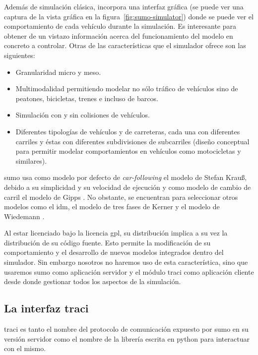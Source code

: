 Además de simulación clásica, incorpora una interfaz gráfica (se puede ver una captura de la vista gráfica en la figura~\ref{fig:sumo-simulator}) donde se puede ver el comportamiento de cada vehículo durante la simulación. Es interesante para obtener de un vistazo información acerca del funcionamiento del modelo en concreto a controlar. Otras de las características que el simulador ofrece son las siguientes:

\begin{itemize}
	\item Granularidad micro y meso.
	\item Multimodalidad permitiendo modelar no sólo tráfico de vehículos sino de peatones, bicicletas, trenes e incluso de barcos.
	\item Simulación con y sin colisiones de vehículos.
	\item Diferentes tipologías de vehículos y de carreteras, cada una con diferentes carriles y éstas con diferentes subdivisiones de subcarriles (diseño conceptual para permitir modelar comportamientos en vehículos como motocicletas y similares).
\end{itemize}

\gls{sumo} usa como modelo por defecto de \textit{\gls{car-following}} el modelo de Stefan Krauß\cite{jin2016evaluation}, debido a su simplicidad y su velocidad de ejecución y como modelo de cambio de carril el modelo de Gipps \cite{krajzewicz2002sumo}. No obstante, se encuentran para seleccionar otros modelos como el \gls{idm}, el modelo de tres fases de Kerner \cite{kerner2008testbed} y el modelo de Wiedemann \cite{wiedemann1974simulation}.

Al estar licenciado bajo la licencia \gls{gpl}, su distribución implica a su vez la distribución de su código fuente. Esto permite la modificación de su comportamiento y el desarrollo de nuevos modelos integrados dentro del simulador. Sin embargo nosotros no haremos uso de esta característica, sino que usaremos \gls{sumo} como aplicación servidor y el módulo \gls{traci} como aplicación cliente desde donde gestionar todos los aspectos de la simulación.

\subsection{La interfaz \gls{traci}}

\gls{traci} \cite{Wegener2008} es tanto el nombre del protocolo de comunicación expuesto por \gls{sumo} en su versión servidor como el nombre de la librería escrita en \gls{python} para interactuar con el mismo.


